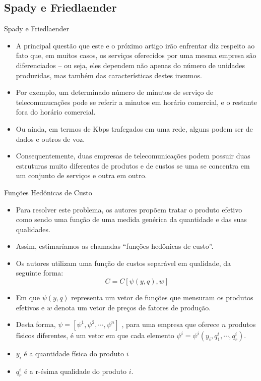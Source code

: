 \documentclass{beamer}
\begin{document}
\subsection{Spady e Friedlaender}
\begin{frame}{Spady e Friedlaender}

\begin{itemize}
\item A principal questão que este e o próximo artigo irão enfrentar diz
respeito ao fato que, em muitos casos, os serviços oferecidos por
uma mesma empresa são diferenciados -- ou seja, eles dependem
não apenas do número de unidades produzidas, mas também das características
destes insumos. 
\item Por exemplo, um determinado número de minutos de serviço de telecomunucações
pode se referir a minutos em horário comercial, e o restante fora
do horário comercial. 
\item Ou ainda, em termos de Kbps trafegados em uma rede, alguns podem ser
de dados e outros de voz. 
\item Consequentemente, duas empresas de telecomunicações podem possuir
duas estruturas muito diferentes de produtos e de custos se uma se
concentra em um conjunto de serviços e outra em outro. 
\end{itemize}



\end{frame}

\begin{frame}{Funções Hedônicas de Custo}
\small
\begin{itemize}
\item Para resolver este problema, os autores propõem tratar o produto efetivo
como sendo uma função de uma medida genérica da quantidade e das suas
qualidades. 
\item Assim, estimaríamos as chamadas ``funções hedônicas de custo''. 
\item Os autores utilizam uma função de custos separável em qualidade, da
seguinte forma:
\[
C=C[\psi(y,q),w]
\]
\item Em que $\psi(y,q)$ representa um vetor de funções que mensuram os
produtos efetivos e $w$ denota um vetor de preços de fatores de produção. 
\item Desta forma, $\psi=[\psi^{1},\psi^{2},\cdots,\psi^{n}]$ , para uma
empresa que oferece $n$ produtos físicos diferentes, é um vetor em
que cada elemento $\psi^{i}=\psi^{i}(y_{i},q_{1}^{i},\cdots,q_{r}^{i})$.
\item $y_{i}$ é a quantidade física do produto $i$ 
\item $q_{r}^{i}$ é a r-ésima qualidade do produto $i$. 
\end{itemize}
\end{frame}
\end{document}
